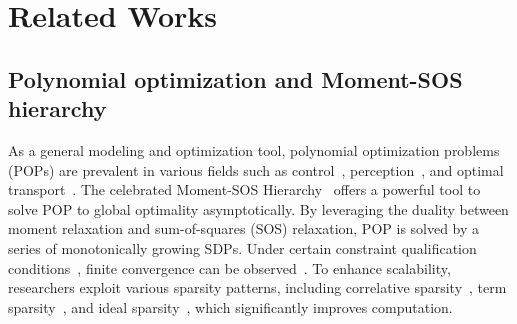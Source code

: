 
\section{Related Works}
\label{sec:relatedworks}

\subsection{Polynomial optimization and Moment-SOS hierarchy}
As a general modeling and optimization tool, polynomial optimization problems (POPs) are prevalent in various fields such as control~\cite{majumdar2013icra-controldedsign-sos}, perception~\cite{yang2022pami-outlierrobust-geometricperception}, and optimal transport~\cite{mula2022arxiv-momentsos-optimal-transport}. 
The celebrated Moment-SOS Hierarchy~\cite{lasserre2001siopt-global} offers a powerful tool to solve POP to global optimality asymptotically. By leveraging the duality between moment relaxation and sum-of-squares (SOS) relaxation, POP is solved by a series of monotonically growing SDPs. Under certain constraint qualification conditions~\cite{nie2023siopt-moment-momentpolynomialopt}, finite convergence can be observed~\cite{yang2022pami-outlierrobust-geometricperception,teng2023arxiv-geometricmotionplanning-liegroup}. To enhance scalability, researchers exploit various sparsity patterns, including correlative sparsity~\cite{lasserre2006msc-correlativesparse}, term sparsity~\cite{wang2021siam-tssos}, and ideal sparsity~\cite{korda2023mp-ideal-sparsity}, which significantly improves computation.

